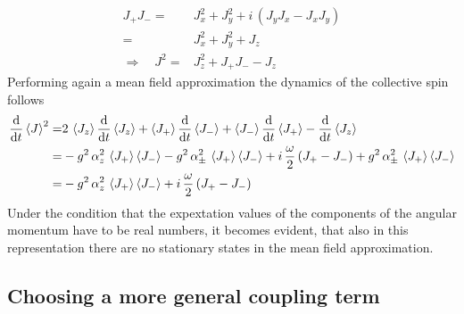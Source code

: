 \documentclass{article}
\begin{document}
\begin{align*}
    J_+ J_- =& J_x^2+J_y^2+i\,(J_y J_x - J_x J_y)\\
    =& J_x^2+J_y^2+J_z\\
    \Rightarrow\quad J^2 =& J_z^2+J_+ J_- - J_z
\end{align*}
Performing again a mean field approximation the dynamics of the collective spin follows
\begin{align*}
    \frac{\text{d}}{\text{d}t} \braket{J}^2=& 2\,\braket{J_z} \frac{\text{d}}{\text{d}t} \braket{J_z} + \braket{J_+} \frac{\text{d}}{\text{d}t} \braket{J_-} + \braket{J_-} \frac{\text{d}}{\text{d}t} \braket{J_+} - \frac{\text{d}}{\text{d}t} \braket{J_z}\\
    =&-g^2\,\alpha_z^2\,\braket{J_+}\braket{J_-}-g^2\,\alpha_\pm^2\,\braket{J_+}\braket{J_-}+i\,\frac{\omega}{2}\,(J_+ - J_-) + g^2\,\alpha_\pm^2\,\braket{J_+}\braket{ J_-}\\
    =&-g^2\,\alpha_z^2\,\braket{J_+}\braket{J_-}+i\,\frac{\omega}{2}\,(J_+ - J_-)
\end{align*}
Under the condition that the expextation values of the components of the angular momentum have to be real numbers, it becomes evident, that also in this representation there are no stationary states in the mean field approximation.\\







\subsection*{Choosing a more general coupling term}
\end{document}
